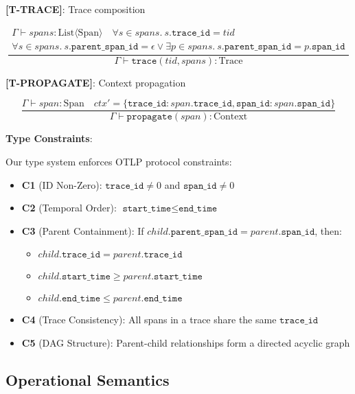 \textbf{[T-TRACE]}: Trace composition

\[
\frac{\begin{array}{c}
      \Gamma \vdash spans : \text{List⟨Span⟩} \quad \forall s \in spans.\ s.\texttt{trace\_id} = tid \\
      \forall s \in spans.\ s.\texttt{parent\_span\_id} = \epsilon \lor \exists p \in spans.\ s.\texttt{parent\_span\_id} = p.\texttt{span\_id}
      \end{array}}
     {\Gamma \vdash \texttt{trace}(tid, spans) : \text{Trace}}
\]

\textbf{[T-PROPAGATE]}: Context propagation

\[
\frac{\Gamma \vdash span : \text{Span} \quad ctx' = \{\texttt{trace\_id}: span.\texttt{trace\_id}, \texttt{span\_id}: span.\texttt{span\_id}\}}
     {\Gamma \vdash \texttt{propagate}(span) : \text{Context}}
\]

\textbf{Type Constraints}:

Our type system enforces OTLP protocol constraints:

\begin{itemize}
\item \textbf{C1} (ID Non-Zero): $\texttt{trace\_id} \neq 0$ and $\texttt{span\_id} \neq 0$
\item \textbf{C2} (Temporal Order): $\texttt{start\_time} \leq \texttt{end\_time}$
\item \textbf{C3} (Parent Containment): If $child.\texttt{parent\_span\_id} = parent.\texttt{span\_id}$, then:
  \begin{itemize}
  \item $child.\texttt{trace\_id} = parent.\texttt{trace\_id}$
  \item $child.\texttt{start\_time} \geq parent.\texttt{start\_time}$
  \item $child.\texttt{end\_time} \leq parent.\texttt{end\_time}$
  \end{itemize}
\item \textbf{C4} (Trace Consistency): All spans in a trace share the same $\texttt{trace\_id}$
\item \textbf{C5} (DAG Structure): Parent-child relationships form a directed acyclic graph
\end{itemize}

\subsection{Operational Semantics}
\label{sec:operational-semantics}

